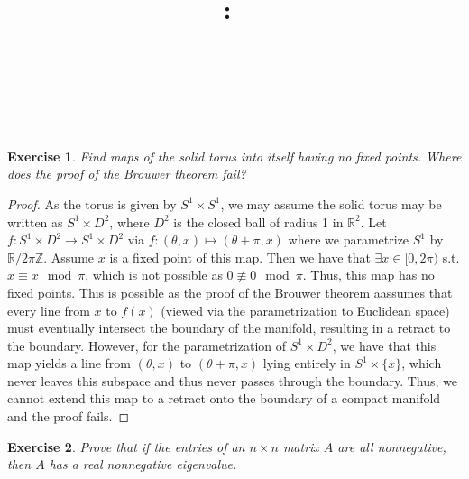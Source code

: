 \documentclass{article}
\title{
    \vspace{2in}
    \textmd{\textbf{\hmwkClass:\ \hmwkTitle}}\\
    \vspace{0.1in}
    \textmd{\hmwkDueDate} \\
    \vspace{0.2in}\large{\textit{\hmwkClassInstructor\  }}
    \vspace{2in}
}
\author{\hmwkAuthorName}
\date{}
\newtheorem{exercise}{Exercise}
\begin{document}
\maketitle

\pagebreak

\begin{exercise}
  Find maps of the solid torus into itself having no fixed points. Where does the proof of the Brouwer theorem fail?
  \end{exercise}

  \begin{proof}
    As the torus is given by $S^{1}\times S^{1}$, we may assume the solid torus may be written as $S^{1} \times D^{2}$, where $D^{2}$ is the closed ball of radius 1 in $\mathbb{R}^{2}$. Let $f:S^{1}\times D^{2}\to S^{1} \times D^{2}$ via $f:(\theta,x) \mapsto (\theta + \pi, x)$ where we parametrize $S^{1}$ by $\mathbb{R}/2\pi\mathbb{Z}$. Assume $x$ is a fixed point of this map. Then we have that $\exists x \in [0,2\pi)$ s.t. $x \equiv x \mod \pi$, which is not possible as $0 \not\equiv 0\mod \pi$. Thus, this map has no fixed points. This is possible as the proof of the Brouwer theorem aassumes that every line from $x$ to $f(x)$ (viewed via the parametrization to Euclidean space) must eventually intersect the boundary of the manifold, resulting in a retract to the boundary. However, for the parametrization of $S^{1} \times D^{2}$, we have that this map yields a line from $(\theta,x)$ to $(\theta + \pi, x)$ lying entirely in $S^{1}\times\{x\}$, which never leaves this subspace and thus never passes through the boundary. Thus, we cannot extend this map to a retract onto the boundary of a compact manifold and the proof fails. 
  \end{proof}

  \begin{exercise}
    Prove that if the entries of an $n \times n$ matrix $A$ are all nonnegative, then $A$ has a real nonnegative eigenvalue. 
  \end{exercise}
\end{document}
